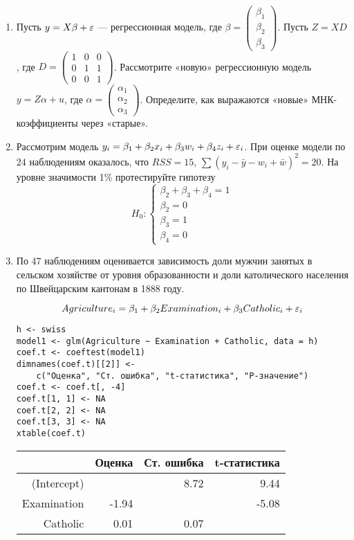\documentclass[12pt, a4paper]{article}
\theoremstyle{definition}
\begin{document}
\begin{enumerate}
\item Пусть $y = X\beta + \varepsilon$ — регрессионная модель, где $\beta = \begin{pmatrix} \beta_1 \\ \beta_2 \\ \beta_3 \end{pmatrix}$. Пусть $Z = XD$, где $D = \begin{pmatrix} 1 & 0 & 0 \\ 0 & 1 & 1 \\ 0 & 0 & 1 \end{pmatrix}$. Рассмотрите «новую» регрессионную модель $y = Z\alpha + u$, где $\alpha = \begin{pmatrix} \alpha_1 \\ \alpha_2 \\ \alpha_3 \end{pmatrix}$. Определите, как выражаются «новые» МНК-коэффициенты через «старые».
\item  Рассмотрим модель $y_i = \beta_1+ \beta_2 x_i + \beta_3 w_i +\beta_4 z_i + \varepsilon_i$.  При оценке модели по $24$ наблюдениям оказалось, что $RSS=15$, $\sum (y_i-\bar{y}-w_i+\bar{w})^2=20$. На уровне значимости 1\% протестируйте гипотезу
\[
H_0:
\begin{cases}
\beta_2+\beta_3+\beta_4=1 \\
\beta_2=0 \\
\beta_3=1 \\
\beta_4=0
\end{cases}
\]
\item  По 47 наблюдениям оценивается зависимость доли мужчин занятых в сельском хозяйстве от уровня образованности и доли католического населения по Швейцарским кантонам в 1888 году.

\[Agriculture_i=\beta_1+\beta_2 Examination_i+\beta_3 Catholic_i+\varepsilon_i\]

\begin{verbatim}
h <- swiss
model1 <- glm(Agriculture ~ Examination + Catholic, data = h)
coef.t <- coeftest(model1)
dimnames(coef.t)[[2]] <-
    c("Оценка", "Ст. ошибка", "t-статистика", "P-значение")
coef.t <- coef.t[, -4]
coef.t[1, 1] <- NA
coef.t[2, 2] <- NA
coef.t[3, 3] <- NA
xtable(coef.t)
\end{verbatim}


\begin{table}[ht]
\centering
\begin{tabular}{rrrr}
  \hline
 & Оценка & Ст. ошибка & t-статистика \\
  \hline
(Intercept) &  & 8.72 & 9.44 \\
  Examination & -1.94 &  & -5.08 \\
  Catholic & 0.01 & 0.07 &  \\
   \hline
\end{tabular}
\end{table}



\end{enumerate}
\end{document}
